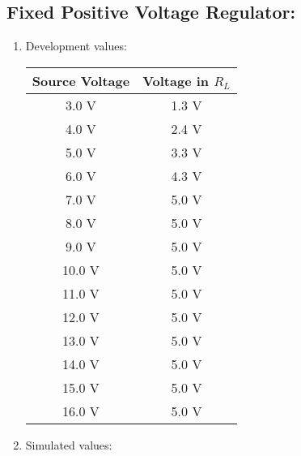 \subsection{Fixed Positive Voltage Regulator:}

\begin{tasks}

\begin{multicols}{2}

\begin{enumerate}
\item Development values:

\begin{center}
\begin{tabular}[.5cm]{ c c }
\toprule
Source Voltage & Voltage in $R_{L}$ \\
\midrule
3.0 V & 1.3 V \\
\cmidrule{1-2}
4.0 V & 2.4 V \\
\cmidrule{1-2}
5.0 V & 3.3 V \\
\cmidrule{1-2}
6.0 V & 4.3 V \\
\cmidrule{1-2}
7.0 V & 5.0 V \\
\cmidrule{1-2}
8.0 V & 5.0 V \\
\cmidrule{1-2}
9.0 V & 5.0 V \\
\cmidrule{1-2}
10.0 V & 5.0 V \\
\cmidrule{1-2}
11.0 V & 5.0 V \\
\cmidrule{1-2}
12.0 V & 5.0 V \\
\cmidrule{1-2}
13.0 V & 5.0 V \\
\cmidrule{1-2}
14.0 V & 5.0 V \\
\cmidrule{1-2}
15.0 V & 5.0 V \\
\cmidrule{1-2}
16.0 V & 5.0 V \\
\bottomrule
\end{tabular}
\end{center} 

\item Simulated values:


\end{enumerate}
\end{multicols}
\end{tasks}
